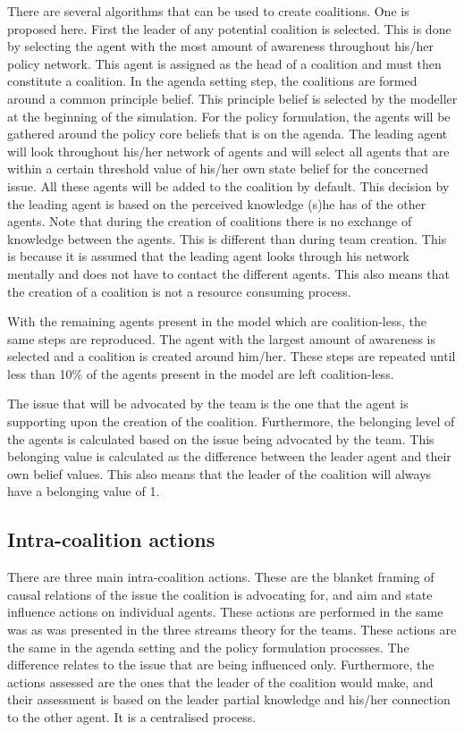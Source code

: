 There are several algorithms that can be used to create coalitions. One is proposed here. First the leader of any potential coalition is selected. This is done by selecting the agent with the most amount of awareness throughout his/her policy network. This agent is assigned as the head of a coalition and must then constitute a coalition. In the agenda setting step, the coalitions are formed around a common principle belief. This principle belief is selected by the modeller at the beginning of the simulation. For the policy formulation, the agents will be gathered around the policy core beliefs that is on the agenda. The leading agent will look throughout his/her network of agents and will select all agents that are within a certain threshold value of his/her own state belief for the concerned issue. All these agents will be added to the coalition by default. This decision by the leading agent is based on the perceived knowledge (s)he has of the other agents. Note that during the creation of coalitions there is no exchange of knowledge between the agents. This is different than during team creation. This is because it is assumed that the leading agent looks through his network mentally and does not have to contact the different agents. This also means that the creation of a coalition is not a resource consuming process.

With the remaining agents present in the model which are coalition-less, the same steps are reproduced. The agent with the largest amount of awareness is selected and a coalition is created around him/her. These steps are repeated until less than 10\% of the agents present in the model are left coalition-less.

The issue that will be advocated by the team is the one that the agent is supporting upon the creation of the coalition. Furthermore, the belonging level of the agents is calculated based on the issue being advocated by the team. This belonging value is calculated as the difference between the leader agent and their own belief values. This also means that the leader of the coalition will always have a belonging value of 1.

\subsection{Intra-coalition actions}

There are three main intra-coalition actions. These are the blanket framing of causal relations of the issue the coalition is advocating for, and aim and state influence actions on individual agents. These actions are performed in the same was as was presented in the three streams theory for the teams. These actions are the same in the agenda setting and the policy formulation processes. The difference relates to the issue that are being influenced only. Furthermore, the actions assessed are the ones that the leader of the coalition would make, and their assessment is based on the leader partial knowledge and his/her connection to the other agent. It is a centralised process.

